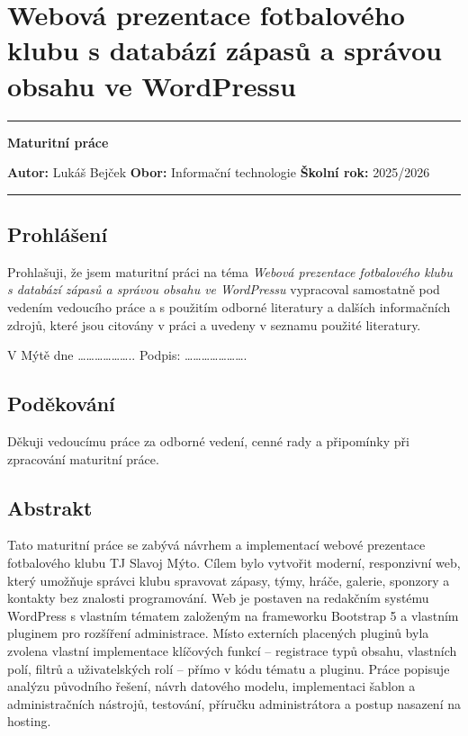 \section{Webová prezentace fotbalového klubu s databází zápasů a správou
obsahu ve
WordPressu}\label{webovuxe1-prezentace-fotbalovuxe9ho-klubu-s-databuxe1zuxed-zuxe1pasux16f-a-spruxe1vou-obsahu-ve-wordpressu}

\begin{center}\rule{0.5\linewidth}{0.5pt}\end{center}

\textbf{Maturitní práce}

\textbf{Autor:} Lukáš Bejček \textbf{Obor:} Informační technologie
\textbf{Školní rok:} 2025/2026

\begin{center}\rule{0.5\linewidth}{0.5pt}\end{center}

\newpage

\subsection{Prohlášení}\label{prohluxe1ux161enuxed}

Prohlašuji, že jsem maturitní práci na téma \emph{Webová prezentace
fotbalového klubu s databází zápasů a správou obsahu ve WordPressu}
vypracoval samostatně pod vedením vedoucího práce a s použitím odborné
literatury a dalších informačních zdrojů, které jsou citovány v práci a
uvedeny v seznamu použité literatury.

V Mýtě dne \ldots\ldots\ldots\ldots\ldots\ldots.. Podpis:
\ldots\ldots\ldots\ldots\ldots\ldots\ldots.

\newpage

\subsection{Poděkování}\label{podux11bkovuxe1nuxed}

Děkuji vedoucímu práce za odborné vedení, cenné rady a připomínky při
zpracování maturitní práce.

\newpage

\subsection{Abstrakt}\label{abstrakt}

Tato maturitní práce se zabývá návrhem a implementací webové prezentace
fotbalového klubu TJ Slavoj Mýto. Cílem bylo vytvořit moderní,
responzivní web, který umožňuje správci klubu spravovat zápasy, týmy,
hráče, galerie, sponzory a kontakty bez znalosti programování. Web je
postaven na redakčním systému WordPress s vlastním tématem založeným na
frameworku Bootstrap 5 a vlastním pluginem pro rozšíření administrace.
Místo externích placených pluginů byla zvolena vlastní implementace
klíčových funkcí -- registrace typů obsahu, vlastních polí, filtrů a
uživatelských rolí -- přímo v kódu tématu a pluginu. Práce popisuje
analýzu původního řešení, návrh datového modelu, implementaci šablon a
administračních nástrojů, testování, příručku administrátora a postup
nasazení na hosting.

